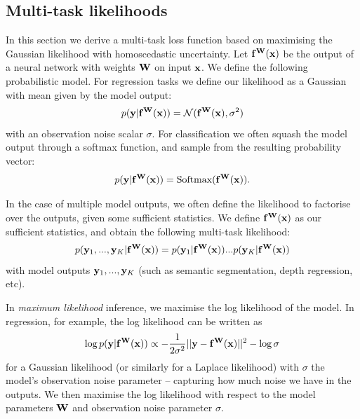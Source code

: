 \subsection{Multi-task likelihoods}
\label{sec:mt_loss}

In this section we derive a multi-task loss function based on maximising the Gaussian likelihood with homoscedastic uncertainty.
Let $\mathbf{f}^{\mathbf{W}}(\mathbf{x})$ be the output of a neural network with weights $\mathbf{W}$ on input $\mathbf{x}$. We define the following probabilistic model. 
For regression tasks we define our likelihood as a Gaussian with mean given by the model output:
\begin{equation}
p(\mathbf{y} | \mathbf{f}^{\mathbf{W}}(\mathbf{x})) = \mathcal{N}(\mathbf{f}^{\mathbf{W}}(\mathbf{x}), \sigma^2)
\end{equation}
with an observation noise scalar $\sigma$. 
For classification we often squash the model output through a softmax function, and sample from the resulting probability vector:
\begin{equation}
p(\mathbf{y} | \mathbf{f}^{\mathbf{W}}(\mathbf{x})) = \text{Softmax}(\mathbf{f}^{\mathbf{W}}(\mathbf{x})).
\end{equation}

In the case of multiple model outputs, we often define the likelihood to factorise over the outputs, given some sufficient statistics. We define $\mathbf{f}^{\mathbf{W}}(\mathbf{x})$ as our sufficient statistics, and obtain the following multi-task likelihood:
\begin{equation}
p(\mathbf{y}_1, ..., \mathbf{y}_K | \mathbf{f}^{\mathbf{W}}(\mathbf{x})) = p(\mathbf{y}_1 | \mathbf{f}^{\mathbf{W}}(\mathbf{x})) ... p(\mathbf{y}_K | \mathbf{f}^{\mathbf{W}}(\mathbf{x}))
\end{equation}
with model outputs $\mathbf{y}_1, ..., \mathbf{y}_K$ (such as semantic segmentation, depth regression, etc).

In \textit{maximum likelihood} inference, we maximise the log likelihood of the model.
In regression, for example, the log likelihood can be written as
\begin{equation}
\log p(\mathbf{y} | \mathbf{f}^{\mathbf{W}}(\mathbf{x})) \propto 
-\frac{1}{2 \sigma^2}||\mathbf{y} - \mathbf{f}^{\mathbf{W}}(\mathbf{x})||^2 - \log \sigma
\end{equation}
for a Gaussian likelihood (or similarly for a Laplace likelihood)
with $\sigma$ the model's observation noise parameter -- capturing how much noise we have in the outputs. We then maximise the log likelihood with respect to the model parameters $\mathbf{W}$ and observation noise parameter $\sigma$.

